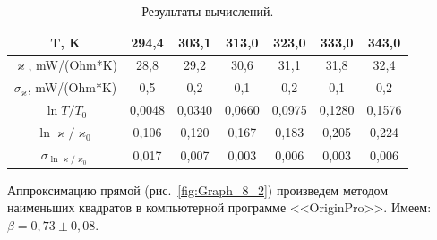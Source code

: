 \documentclass[a4paper,12pt]{article} %
\begin{document}
\begin{enumerate}
	
\begin{table}[h]
\caption{Результаты вычислений.}
\label{table:results_3}
\begin{tabular}{|c|c|c|c|c|c|c|}
\hline
T, K                                  & 294,4  & 303,1  & 313,0  & 323,0  & 333,0  & 343,0  \\ \hline
$\varkappa$, mW/(Ohm*K)               & 28,8   & 29,2   & 30,6   & 31,1   & 31,8   & 32,4   \\ \hline
$\sigma_{\varkappa}$, mW/(Ohm*K)      & 0,5    & 0,2    & 0,1    & 0,2    & 0,1    & 0,2    \\ \hline
$\ln {T/T_0}$                         & 0,0048 & 0,0340 & 0,0660 & 0,0975 & 0,1280 & 0,1576 \\ \hline
$\ln {\varkappa/\varkappa_0}$         & 0,106  & 0,120  & 0,167  & 0,183  & 0,205  & 0,224  \\ \hline
$\sigma_{\ln {\varkappa/\varkappa_0}}$ & 0,017  & 0,007  & 0,003  & 0,006  & 0,003  & 0,006  \\ \hline
\end{tabular}
\end{table}


Аппроксимацию прямой (рис.~\ref{fig:Graph_8_2}) произведем методом наименьших квадратов в компьютерной программе <<OriginPro>>. Имеем: $\beta = 0,73 \pm 0,08$.



\end{enumerate}
\end{document}
